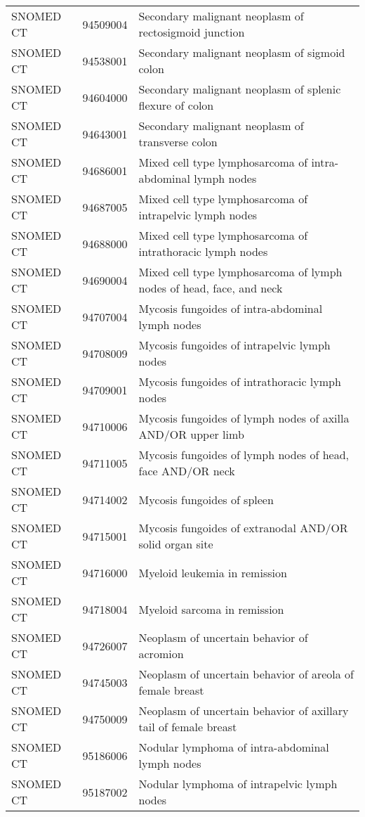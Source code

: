 \begin{longtable}{p{}p{}p{}}
  SNOMED CT & 94509004 & Secondary malignant neoplasm of rectosigmoid junction \\ 
  SNOMED CT & 94538001 & Secondary malignant neoplasm of sigmoid colon \\ 
  SNOMED CT & 94604000 & Secondary malignant neoplasm of splenic flexure of colon \\ 
  SNOMED CT & 94643001 & Secondary malignant neoplasm of transverse colon \\ 
  SNOMED CT & 94686001 & Mixed cell type lymphosarcoma of intra-abdominal lymph nodes \\ 
  SNOMED CT & 94687005 & Mixed cell type lymphosarcoma of intrapelvic lymph nodes \\ 
  SNOMED CT & 94688000 & Mixed cell type lymphosarcoma of intrathoracic lymph nodes \\ 
  SNOMED CT & 94690004 & Mixed cell type lymphosarcoma of lymph nodes of head, face, and neck \\ 
  SNOMED CT & 94707004 & Mycosis fungoides of intra-abdominal lymph nodes \\ 
  SNOMED CT & 94708009 & Mycosis fungoides of intrapelvic lymph nodes \\ 
  SNOMED CT & 94709001 & Mycosis fungoides of intrathoracic lymph nodes \\ 
  SNOMED CT & 94710006 & Mycosis fungoides of lymph nodes of axilla AND/OR upper limb \\ 
  SNOMED CT & 94711005 & Mycosis fungoides of lymph nodes of head, face AND/OR neck \\ 
  SNOMED CT & 94714002 & Mycosis fungoides of spleen \\ 
  SNOMED CT & 94715001 & Mycosis fungoides of extranodal AND/OR solid organ site \\ 
  SNOMED CT & 94716000 & Myeloid leukemia in remission \\ 
  SNOMED CT & 94718004 & Myeloid sarcoma in remission \\ 
  SNOMED CT & 94726007 & Neoplasm of uncertain behavior of acromion \\ 
  SNOMED CT & 94745003 & Neoplasm of uncertain behavior of areola of female breast \\ 
  SNOMED CT & 94750009 & Neoplasm of uncertain behavior of axillary tail of female breast \\ 
  SNOMED CT & 95186006 & Nodular lymphoma of intra-abdominal lymph nodes \\ 
  SNOMED CT & 95187002 & Nodular lymphoma of intrapelvic lymph nodes \\ 

\end{longtable}
